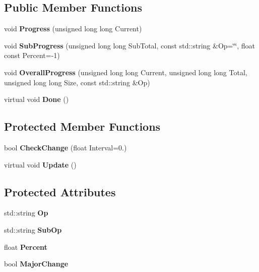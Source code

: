 \subsection*{\-Public \-Member \-Functions}
\begin{DoxyCompactItemize}
\item 
void {\bfseries \-Progress} (unsigned long long \-Current)\label{classOpProgress_aa7fc0f7dcf48129abbdb84cbfc8ba9f5}

\item 
void {\bfseries \-Sub\-Progress} (unsigned long long \-Sub\-Total, const std\-::string \&\-Op=\char`\"{}\char`\"{}, float const \-Percent=-\/1)\label{classOpProgress_aaabe1f6a832b8ad4c93049ab30ab5d34}

\item 
void {\bfseries \-Overall\-Progress} (unsigned long long \-Current, unsigned long long \-Total, unsigned long long \-Size, const std\-::string \&\-Op)\label{classOpProgress_a52b96aec84e11e7b68354aa40272d57a}

\item 
virtual void {\bfseries \-Done} ()\label{classOpProgress_a1397402314a5ad9d7b594d579457f7b6}

\end{DoxyCompactItemize}
\subsection*{\-Protected \-Member \-Functions}
\begin{DoxyCompactItemize}
\item 
bool {\bfseries \-Check\-Change} (float \-Interval=0.)\label{classOpProgress_a079b081f596290e6da37cb3b6255e4a6}

\item 
virtual void {\bfseries \-Update} ()\label{classOpProgress_afbb0cdaa3423f2f5357126cfeabc3b9a}

\end{DoxyCompactItemize}
\subsection*{\-Protected \-Attributes}
\begin{DoxyCompactItemize}
\item 
std\-::string {\bfseries \-Op}\label{classOpProgress_a054861b40cadd19f962263b71fedda89}

\item 
std\-::string {\bfseries \-Sub\-Op}\label{classOpProgress_a0df8bc2d188231e2581f16b9b4236ed5}

\item 
float {\bfseries \-Percent}\label{classOpProgress_a4f8ffabe400e23233c2a3a36d3aa45d5}

\item 
bool {\bfseries \-Major\-Change}\label{classOpProgress_a7b0edc8a377388b7f8e3b85cfe3f78fb}

\end{DoxyCompactItemize}


